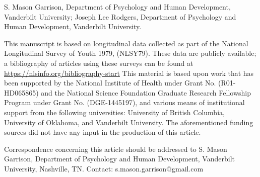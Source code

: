 {\small S. Mason Garrison, Department of Psychology and Human Development, Vanderbilt University; Joseph Lee Rodgers, Department of Psychology and Human Development, Vanderbilt University.

This manuscript is based on longitudinal data collected as part of the National Longitudinal Survey of Youth 1979, (NLSY79). These data are publicly available; a bibliography of articles using these surveys can be found at \url{https://nlsinfo.org/bibliography-start} This material is based upon work that has been supported by the National Institute of Health under Grant No. (R01-HD065865) and the National Science Foundation Graduate Research Fellowship Program under Grant No. (DGE-1445197), and various means of institutional support from the following universities: University of British Columbia, University of Oklahoma, and Vanderbilt University. The aforementioned funding sources did not have any input in the production of this article.

Correspondence concerning this article should be addressed to S. Mason Garrison, Department of Psychology and Human Development, Vanderbilt University, Nashville, TN. Contact: s.mason.garrison@gmail.com}
